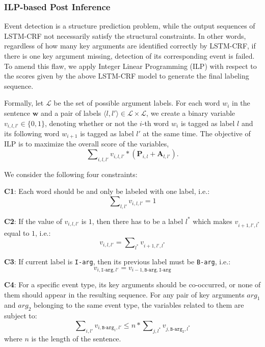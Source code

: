 \documentclass{article}
\begin{document}
\subsubsection{ILP-based Post Inference}
Event detection is a structure prediction problem, while the output sequences of LSTM-CRF not necessarily satisfy the structural constraints. In other words, regardless of how many key arguments are identified correctly by LSTM-CRF, if there is one key argument missing, detection of its corresponding event is failed. To amend this flaw, we apply Integer Linear Programming (ILP) with respect to the scores given by the above LSTM-CRF model to generate the final labeling sequence.

Formally, let $\mathcal{L}$ be the set of possible argument labels. For each word $w_i$ in the sentence $\bm{w}$ and a pair of labels $ \langle l, l' \rangle \in \mathcal{L} \times \mathcal{L}$, we create a binary variable ${v_{i,l,l'} \in \{0, 1\}}$, denoting whether or not the $i$-th word $w_i$ is tagged as label $l$ and its following word $w_{i+1}$ is tagged as label $l'$ at the same time. The objective of ILP is to maximize the overall score of the variables,
\begin{displaymath}
	\sum\nolimits_{i, l, l'}v_{i,l,l'} * (\textbf{P}_{i,l}+\textbf{A}_{l,l'}) .
\end{displaymath}

We consider the following four constraints:

\textbf{C1}: Each word should be and only be labeled with one label, i.e.:
\begin{equation}
	\sum\nolimits_{l,l'}v_{i,l,l'}=1
\end{equation}

\textbf{C2}: If the value of $v_{i,l,l'}$ is $1$, then there has to be a label $l^*$ which makes $v_{i+1,l',l^*}$ equal to $1$, i.e.:
\begin{equation}
	v_{i,l,l'} = \sum\nolimits_{l^*}v_{i+1,l',l^*}
\end{equation}

\textbf{C3}: If current label is \texttt{I-arg}, then its previous label must be \texttt{B-arg}, i.e.:
\begin{equation}
	v_{i,\texttt{I-arg},l'} = v_{i-1,\texttt{B-arg},\texttt{I-arg}}
\end{equation}

\textbf{C4}: For a specific event type, its key arguments should be co-occurred, or none of them should appear in the resulting sequence. For any pair of key arguments $arg_1$ and $arg_2$ belonging to the same event type, the variables related to them are subject to:
\begin{equation}
	\sum\nolimits_{i,l'}{v_{i,\texttt{B-arg}_1,l'}} \leq n * \sum\nolimits_{j,l^*}{v_{j,\texttt{B-arg}_2,l^*}}
\end{equation}
where $n$ is the length of the sentence.
\end{document}
